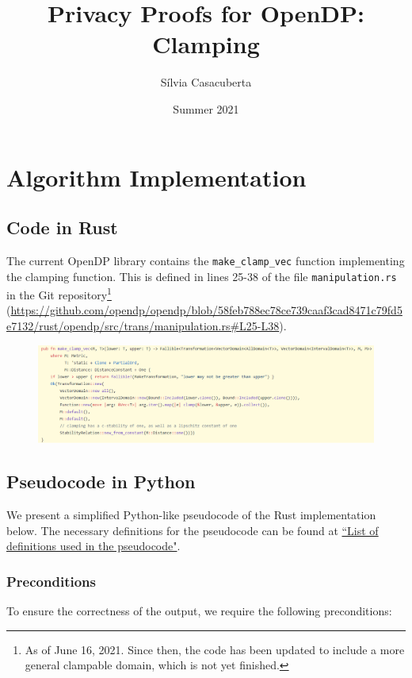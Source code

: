 \documentclass[11pt,a4paper]{article}
\title{Privacy Proofs for OpenDP: Clamping}
\author{S\'ilvia Casacuberta}
\date{Summer 2021}
\theoremstyle{definition}
\newcommand{\silvia}[1]{{ {\color{blue}{(silvia)~#1}}}}
\begin{document}
\maketitle

\tableofcontents

\section{Algorithm Implementation}

\subsection{Code in Rust}
The current OpenDP library contains the \texttt{make\_clamp\_vec} function implementing the clamping function. This is defined in lines 25-38 of the file \texttt{manipulation.rs} in the Git repository\footnote{As of June 16, 2021. Since then, the code has been updated to include a more general clampable domain, which is not yet finished.} (\url{https://github.com/opendp/opendp/blob/58feb788ec78ce739caaf3cad8471c79fd5e7132/rust/opendp/src/trans/manipulation.rs#L25-L38}).

\begin{figure}[ht]
    \includegraphics[width=16cm]{clamp_rust.png}
    \centering
    \label{fig:code}
\end{figure}

\silvia{Flag: will change to the new clampable domain code once total ordering has been implemented.}

\subsection{Pseudocode in Python}\label{sec:pseudocode}
We present a simplified Python-like pseudocode of the Rust implementation below. The necessary definitions for the pseudocode can be found at \href{https://www.overleaf.com/project/60d215bf90b337ac02200a99}{``List of definitions used in the pseudocode"}. 

\subsubsection*{Preconditions}
To ensure the correctness of the output, we require the following preconditions:
\end{document}

